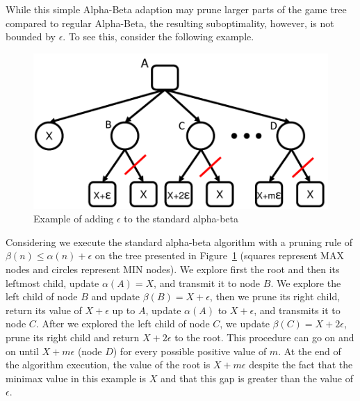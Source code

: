 \documentclass[letterpaper]{article} %
\begin{document}
While this simple Alpha-Beta adaption may prune larger parts of the game tree compared to regular Alpha-Beta, the resulting suboptimality, however, is not bounded by $\epsilon$.
To see this, consider the following example. 

\begin{figure}
	\centering
	\includegraphics[width=0.85\columnwidth]{Figures/example_e.pdf}
	\caption{Example of adding $\epsilon$ to the standard alpha-beta}
	\label{fig:example-e}
\end{figure}

Considering we execute the standard alpha-beta algorithm with a pruning rule of $\beta(n) \leq \alpha(n)+\epsilon$ on the tree presented in Figure~\ref{fig:example-e} (squares represent MAX nodes and circles represent MIN nodes).
We explore first the root and then its leftmost child, update $\alpha(A)=X$, and transmit it to node $B$.
We explore the left child of node $B$ and update $\beta(B)=X+\epsilon$, then we prune its right child, return its value of $X+\epsilon$ up to $A$, update $\alpha(A)$ to $X+\epsilon$, and transmits it to node $C$. 
After we explored the left child of node $C$, we update $\beta(C)=X+2\epsilon$, prune its right child and return $X+2\epsilon$ to the root.
This procedure can go on and on until $X+m\epsilon$ (node $D$) for every possible positive value of $m$.
At the end of the algorithm execution, the value of the root is $X+m\epsilon$ despite the fact that the minimax value in this example is $X$ and that this gap is greater than the value of $\epsilon$.

\end{document}
